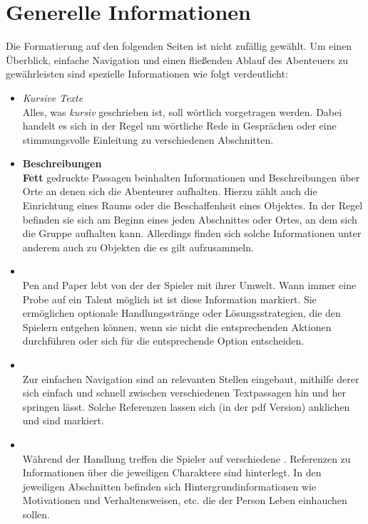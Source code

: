 \thispagestyle{fancy-info}
\section*{Generelle Informationen}

Die Formatierung auf den folgenden Seiten ist nicht zufällig gewählt. Um einen Überblick, einfache Navigation und
einen fließenden Ablauf des Abenteuers zu gewährleisten sind spezielle Informationen wie folgt verdeutlicht:

\begin{itemize}
  \item \textit{Kursive Texte} \\
  Alles, was \textit{kursiv} geschrieben ist, soll wörtlich vorgetragen werden. Dabei handelt es sich in der Regel
  um wörtliche Rede in Gesprächen oder eine stimmungsvolle Einleitung zu verschiedenen Abschnitten.

  \item \textbf{Beschreibungen} \\
  \textbf{Fett} gedruckte Passagen beinhalten Informationen und Beschreibungen über Orte an denen sich die
  Abenteurer aufhalten. Hierzu zählt auch die Einrichtung eines Raums oder die Beschaffenheit eines Objektes.
  In der Regel befinden sie sich am Beginn eines jeden Abschnittes oder Ortes, an dem sich die Gruppe aufhalten
  kann. Allerdings finden sich solche Informationen unter anderem auch zu Objekten die es gilt aufzusammeln.

  \item {} \\
  Pen and Paper lebt von der  der Spieler mit ihrer Umwelt. Wann immer eine Probe auf ein Talent
  möglich ist ist diese Information  markiert. Sie ermöglichen optionale Handlungsstränge oder
  Lösungsstrategien, die den Spielern entgehen können, wenn sie nicht die entsprechenden Aktionen durchführen oder
  sich für die entsprechende Option entscheiden.

  \item {} \\
  Zur einfachen Navigation sind an relevanten Stellen  eingebaut, mithilfe derer sich einfach und
  schnell zwischen verschiedenen Textpassagen hin und her springen lässt. Solche Referenzen lassen sich (in der pdf
  Version) anklichen und sind  markiert.

  \item {} \\
  Während der Handlung treffen die Spieler auf verschiedene . Referenzen zu Informationen über
  die jeweiligen Charaktere sind  hinterlegt. In den jeweiligen Abschnitten befinden sich
  Hintergrundinformationen wie Motivationen und Verhaltensweisen, etc. die der Person Leben einhauchen sollen.

\end{itemize}
\newpage
